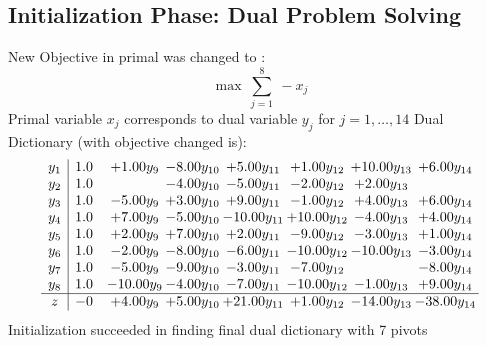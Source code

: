 \documentclass[9pt]{article}
\begin{document}
\subsection{Initialization Phase: Dual Problem Solving}
New Objective in primal was changed to : \[ \max\ \sum_{j=1}^{8}\ - x_j \] 
Primal variable $x_j$ corresponds to dual variable $y_j$ for $j = 1,\ldots,14$
Dual Dictionary (with objective changed is): 
\[\begin{array}{c| c c@{\hskip 2pt} c@{\hskip 2pt} c@{\hskip 2pt} c@{\hskip 2pt} c@{\hskip 2pt} c@{\hskip 2pt} }
 y_{1}   &  1.0 & +  1.00 y_{9} & -8.00 y_{10} & +  5.00 y_{11} & +  1.00 y_{12} & + 10.00 y_{13} & +  6.00 y_{14}\\
 y_{2}   &  1.0  &   & -4.00 y_{10} & -5.00 y_{11} & -2.00 y_{12} & +  2.00 y_{13} &   \\
 y_{3}   &  1.0 & -5.00 y_{9} & +  3.00 y_{10} & +  9.00 y_{11} & -1.00 y_{12} & +  4.00 y_{13} & +  6.00 y_{14}\\
 y_{4}   &  1.0 & +  7.00 y_{9} & -5.00 y_{10} & -10.00 y_{11} & + 10.00 y_{12} & -4.00 y_{13} & +  4.00 y_{14}\\
 y_{5}   &  1.0 & +  2.00 y_{9} & +  7.00 y_{10} & +  2.00 y_{11} & -9.00 y_{12} & -3.00 y_{13} & +  1.00 y_{14}\\
 y_{6}   &  1.0 & -2.00 y_{9} & -8.00 y_{10} & -6.00 y_{11} & -10.00 y_{12} & -10.00 y_{13} & -3.00 y_{14}\\
 y_{7}   &  1.0 & -5.00 y_{9} & -9.00 y_{10} & -3.00 y_{11} & -7.00 y_{12} &   & -8.00 y_{14}\\
 y_{8}   &  1.0 & -10.00 y_{9} & -4.00 y_{10} & -7.00 y_{11} & -10.00 y_{12} & -1.00 y_{13} & +  9.00 y_{14}\\
\hline
z    &  -0 & +  4.00 y_{9} & +  5.00 y_{10} & + 21.00 y_{11} & +  1.00 y_{12} & -14.00 y_{13} & -38.00 y_{14}\\
\end{array}\]
Initialization succeeded in finding final dual dictionary with 7 pivots
\end{document}
